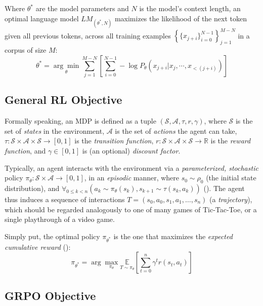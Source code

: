 \documentclass{article} %
\theoremstyle{definition}
\begin{document}
Where $\theta^{*}$ are the model parameters and $N$ is the model's context length, 
an optimal language model $LM_{(\theta^{*}, N)}$
maximizes the likelihood of the next token given all previous tokens, across all training examples
$\left\{\{x_{j + i}\}_{i = 0}^{N - 1}\right\}_{j = 1}^{M - N}$ 
in a corpus of size $M$:
\begin{equation} \label{eq:pretrain-obj}
    \theta^{*} = \underset{\theta}{\arg\min} \sum_{j = 1}^{M - N} \left[\sum_{i = 0}^{N - 1} -\log P_{\theta}(x_{j + i} | x_j, \cdots, x_{< (j + i)})\right]
\end{equation}

\subsection{General RL Objective}
\label{sec:rl-obj}

Formally speaking, an MDP is defined as a tuple $(\mathcal{S}, \mathcal{A}, \tau, r, \gamma)$, 
where $\mathcal{S}$ is the set of \textit{states} in the environment, 
$\mathcal{A}$ is the set of \textit{actions} the agent can take,
$\tau: \mathcal{S} \times \mathcal{A} \times \mathcal{S} \rightarrow [0, 1]$ is the \textit{transition function},
$r: \mathcal{S} \times \mathcal{A} \times \mathcal{S} \rightarrow \mathbb{R}$ is the \textit{reward function}, and 
$\gamma \in [0, 1]$ is (an optional) \textit{discount factor}.


Typically, an agent interacts with the environment 
via a \textit{parameterized, stochastic} policy $\pi_\theta: \mathcal{S} \times \mathcal{A} \rightarrow [0, 1]$,
in an \textit{episodic} manner, where $s_0 \sim \rho_0$ (the initial state distribution),
and $\forall_{0 \leq k < n}\left(a_{k} \sim \pi_\theta(s_k), s_{k+1} \sim \tau(s_k, a_{k})\right)$ (\cite{wk1}). 
The agent thus induces a sequence of interactions $T = (s_0, a_0, s_1, a_1, \ldots, s_n)$
(a \textit{trajectory}), which should be regarded analogously to one
of many games of Tic-Tac-Toe, or a single playthrough of a video game.

Simply put, the optimal policy $\pi_{\theta^{*}}$ is the one that maximizes the \textit{expected cumulative reward} (\cite{wk2}):
\begin{equation} \label{eq:rl-obj}
    \pi_{\theta^{*}} = {\displaystyle \arg\max_{\pi_\theta} \underset{T \sim \pi_{\theta}}{\mathbb{E}} \left[ \sum_{t=0}^{n} \gamma^t r(s_t, a_t) \right] }
\end{equation}

\subsection{GRPO Objective}
\label{sec:grpo-obj}
\end{document}
